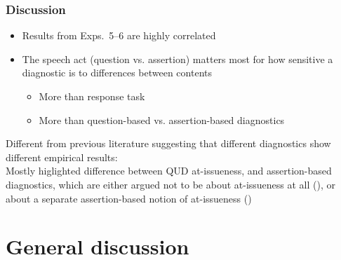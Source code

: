 \documentclass[compress, xcolor = dvipsnames, aspectratio=169]{beamer}
\begin{document}
	\begin{frame}\frametitle{Discussion}
		
		\begin{itemize}
			\item Results from Exps.~5–6 are highly correlated 
			\item The speech act (question vs. assertion) matters most for how sensitive a diagnostic is to differences between contents
			\begin{itemize}
				\item More than response task
				\item More than question-based vs. assertion-based diagnostics
			\end{itemize}
		\end{itemize} \vfill \pause

		{\scriptsize Different from previous literature suggesting that different diagnostics show different empirical results:\\
		Mostly higlighted difference between QUD at-issueness, and assertion-based diagnostics, which are either argued not to be about at-issueness at all (\citealt{snider_anaphoric_2017,snider_at-issuenessne_2017,snider_distinguishing_2018}), or about a separate assertion-based notion of at-issueness (\citealt{koev_notions_2018,faller_discourse_2019,korotkova_evidential_2020})}

	\end{frame}	

\section{General discussion}
\end{document}
